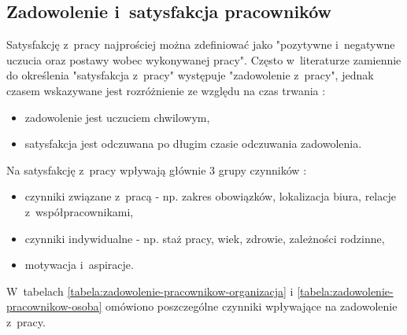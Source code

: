 
\subsection{Zadowolenie i~satysfakcja pracowników}\label{sec:czynniki-wplywajace-na-fluktuacje:zadowolenie}
Satysfakcję z~pracy najprościej można zdefiniować jako "pozytywne i~negatywne uczucia oraz postawy wobec wykonywanej pracy"\cite{shultz-2002}.
Często w~literaturze zamiennie do określenia "satysfakcja z~pracy" występuje "zadowolenie z~pracy", jednak czasem wskazywane jest rozróżnienie ze względu na czas trwania \cite{sowinska-2014}:
\begin{itemize}
    \item zadowolenie jest uczuciem chwilowym,
    \item satysfakcja jest odczuwana po długim czasie odczuwania zadowolenia.
\end{itemize}

Na satysfakcję z~pracy wpływają głównie 3 grupy czynników \cite{shultz-2002}:
\begin{itemize}
    \item czynniki związane z~pracą - np. zakres obowiązków, lokalizacja biura, relacje z~współpracownikami,
    \item czynniki indywidualne - np. staż pracy, wiek, zdrowie, zależności rodzinne,
    \item motywacja i~aspiracje.
\end{itemize}

W~tabelach \ref{tabela:zadowolenie-pracownikow-organizacja} i \ref{tabela:zadowolenie-pracownikow-osoba} omówiono poszczególne czynniki wpływające na zadowolenie z~pracy.


